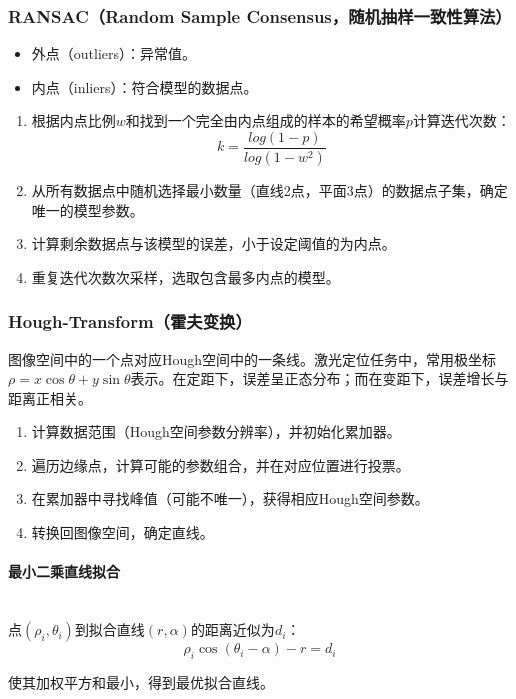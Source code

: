\documentclass[
12pt, %
a4paper, 
oneside, %
headinclude,footinclude, %
]{scrartcl}
\begin{document}
\subsubsection[RANSAC]{RANSAC（Random Sample Consensus，随机抽样一致性算法）}
\begin{itemize}
\item 外点（outliers）：异常值。
\item 内点（inliers）：符合模型的数据点。
\end{itemize}
\begin{enumerate}
\item 根据内点比例$ w $和找到一个完全由内点组成的样本的希望概率$ p $计算迭代次数：
$$ k = \frac{log(1 - p)}{log(1 - w^2)} $$
\item 从所有数据点中随机选择最小数量（直线2点，平面3点）的数据点子集，确定唯一的模型参数。
\item 计算剩余数据点与该模型的误差，小于设定阈值的为内点。
\item 重复迭代次数次采样，选取包含最多内点的模型。
\end{enumerate}
\subsubsection[Hough-Transform]{Hough-Transform（霍夫变换）}
图像空间中的一个点对应Hough空间中的一条线。激光定位任务中，常用极坐标$ \rho = x \cos \theta + y \sin \theta $表示。在定距下，误差呈正态分布；而在变距下，误差增长与距离正相关。
\begin{enumerate}
\item 计算数据范围（Hough空间参数分辨率），并初始化累加器。
\item 遍历边缘点，计算可能的参数组合，并在对应位置进行投票。
\item 在累加器中寻找峰值（可能不唯一），获得相应Hough空间参数。
\item 转换回图像空间，确定直线。
\end{enumerate}
\paragraph{最小二乘直线拟合}~\\

点$ (\rho_i, \theta_i) $到拟合直线$ (r, \alpha) $的距离近似为$ d_i $：
$$ \rho_i \cos(\theta_i - \alpha) - r = d_i $$

使其加权平方和最小，得到最优拟合直线。
\end{document}
